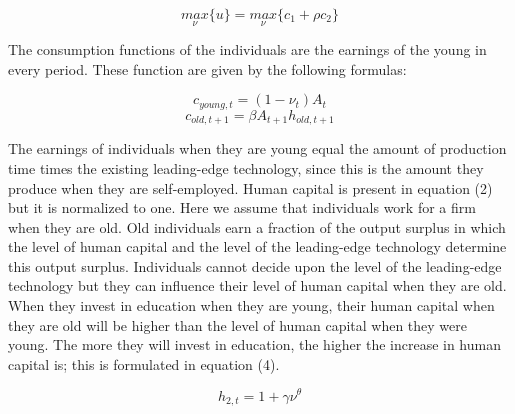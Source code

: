 \documentclass[a4paper,11pt]{article} %
\begin{document}
\begin{equation}
  \underset{\nu}{max}\{u\}=\underset{\nu}{max}\{c_1+\rho c_2\}
\end{equation}

The consumption functions of the individuals are the earnings of the young in every period. These function are given by the following formulas:

\begin{equation}
  c_{young,t}=(1-\nu_t)A_t
\end{equation}
\begin{equation}
  c_{old,t+1}=\beta A_{t+1}h_{old,t+1}
\end{equation}

The earnings of individuals when they are young equal the amount of production time times the existing leading-edge technology, since this is the amount they produce when they are self-employed. Human capital is present in equation (2) but it is normalized to one. Here we assume that individuals work for a firm when they are old. Old individuals earn a fraction of the output surplus in which the level of human capital and the level of the leading-edge technology determine this output surplus. Individuals cannot decide upon the level of the leading-edge technology but they can influence their level of human capital when they are old. When they invest in education when they are young, their human capital when they are old will be higher than the level of human capital when they were young. The more they will invest in education, the higher the increase in human capital is; this is formulated in equation (4).

\begin{equation*}
  h_{2,t}=1+\gamma\nu^{\theta}
\end{equation*}

\end{document}
